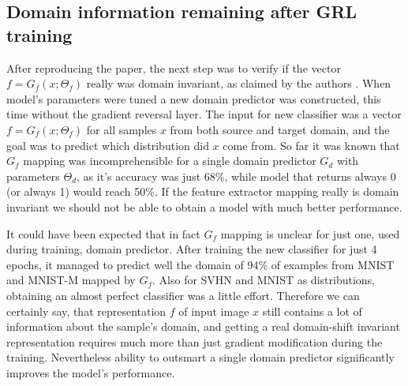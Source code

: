 \documentclass{article}
\begin{document}
\subsection{Domain information remaining after GRL training}
After reproducing the paper, the next step was to verify if the vector $f=G_{f}(x;\Theta_{f})$ really was domain invariant, as claimed by the authors \cite{pmlr-v37-ganin15}. When model's parameters were tuned a new domain predictor was constructed, this time without the gradient reversal layer. The input for new classifier was a vector $f = G_{f}(x;\Theta_{f})$ for all samples $x$ from both source and target domain, and the goal was to predict which distribution did $x$ come from. So far it was known that $G_{f}$ mapping was incomprehensible for a single domain predictor $G_{d}$ with parameters $\Theta_{d}$, as it's accuracy was just 68\%, while model that returns always 0 (or always 1) would reach 50\%. If the feature extractor mapping really is domain invariant we should not be able to obtain a model with much better performance.
\par
It could have been expected that in fact $G_{f}$ mapping is unclear for just one, used during training, domain predictor. After training the new classifier for just 4 epochs, it managed to predict well the domain of 94\% of examples from MNIST and MNIST-M mapped by $G_{f}$. Also for SVHN and MNIST as distributions, obtaining an almost perfect classifier was a little effort. Therefore we can certainly say, that representation $f$ of input image $x$ still contains a lot of information about the sample's domain, and getting a real domain-shift invariant representation requires much more than just gradient modification during the training. Nevertheless ability to outsmart a single domain predictor significantly improves the model's performance.
\end{document}

